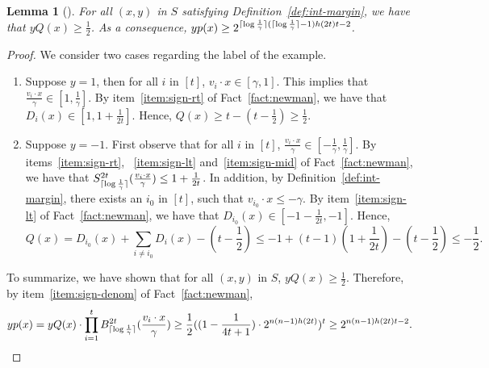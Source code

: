 \documentclass{article}
\DeclarePairedDelimiter\ceil{\lceil}{\rceil}
\newtheorem{lemma}[theorem]{Lemma}
\begin{document}
\begin{lemma}[\cite{klivans2004learning}]
For all $(x,y)$ in $S$ satisfying Definition~\ref{def:int-margin}, we have that $y Q(x) \geq \frac 1 2$.
As a consequence, $y p(x) \geq 2^{\ceil{\log \frac 1 \gamma}(\ceil{\log \frac 1 \gamma}-1)h(2t)t - 2}$.
\label{lem:rational-margin}
\end{lemma}
\begin{proof}
We consider two cases regarding the label of the example.
\begin{enumerate}
\item Suppose $y = 1$, then for all $i$ in $[t]$, $v_i \cdot x \in [\gamma, 1]$. This implies that $\frac{v_i \cdot x}{\gamma} \in [1, \frac 1 \gamma]$.
By item~\ref{item:sign-rt} of Fact~\ref{fact:newman}, we have that $D_i(x) \in [1, 1+ \frac 1 {2t}]$.
Hence, $Q(x) \geq t - (t - \frac 1 2) \geq \frac 1 2$.

\item Suppose $y = -1$. First observe that for all $i$ in $[t]$, $\frac{v_i \cdot x}{\gamma} \in [-\frac 1\gamma, \frac 1 \gamma]$. By items~\ref{item:sign-rt},
~\ref{item:sign-lt} and~\ref{item:sign-mid} of Fact~\ref{fact:newman}, we have that $S_{\ceil{\log \frac 1 \gamma}}^{2t}(\frac{v_i \cdot x}{\gamma}) \leq 1+ \frac 1 {2t}$.
In addition, by Definition~\ref{def:int-margin}, there exists an $i_0$ in $[t]$, such that $v_{i_0} \cdot x \leq -\gamma$.
By item~\ref{item:sign-lt} of Fact~\ref{fact:newman}, we have that
$D_{i_0}(x) \in [-1 - \frac 1 {2t}, -1]$.
Hence,
\[ Q(x) = D_{i_0}(x) + \sum_{i \neq i_0} D_i(x) - (t - \frac 1 2)
\leq -1 + (t-1)(1 + \frac 1 {2t}) - (t - \frac 1 2) \leq - \frac 1 2. \]
\end{enumerate}
To summarize, we have shown that for all $(x,y)$ in $S$, $y Q(x) \geq \frac 1 2$.
Therefore, by item~\ref{item:sign-denom} of Fact~\ref{fact:newman}, 
\[ y p(x) = y Q(x) \cdot \prod_{i=1}^t B_{\ceil{\log \frac 1 \gamma}}^{2t}(\frac{v_i \cdot x}\gamma) \geq \frac 1 2 ((1-\frac{1}{4t+1}) \cdot 2^{n(n-1)h(2t)})^t \geq 2^{n(n-1)h(2t)t - 2}. \]
\end{proof}
\end{document}
